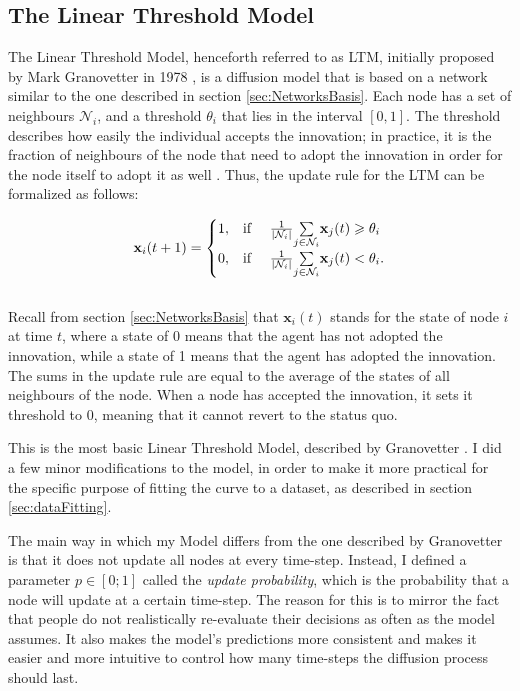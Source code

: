 \documentclass[11pt]{article}
\begin{document}
	\subsection{The Linear Threshold Model} \label{sec:LinearThreshold}
	The Linear Threshold Model, henceforth referred to as LTM, initially proposed by Mark Granovetter in 1978 \autocite{Granovetter78}, is a diffusion model that is based on a network similar to the one described in section \ref{sec:NetworksBasis}. Each node has a set of neighbours $\mathcal{N}_i$, and a threshold $\theta_i$ that lies in the interval $[0,1]$. The threshold describes how easily the individual accepts the innovation; in practice, it is the fraction of neighbours of the node that need to adopt the innovation in order for the node itself to adopt it as well \autocite{Granovetter78}. Thus, the update rule for the LTM can be formalized as follows:
	
	$$\mathbf{x}_i(t+1) = 
	\begin{cases}
		1, & \text{if \quad} \frac{1}{\lvert \mathcal{N}_i \rvert} \underset{j \in \mathcal{N}_i}{\sum} \mathbf{x}_j(t) \geqslant \theta_i\\
		0, & \text{if \quad} \frac{1}{\lvert \mathcal{N}_i \rvert} \underset{j \in \mathcal{N}_i}{\sum} \mathbf{x}_j(t) < \theta_i.\\
	\end{cases}
	$$
	\\
	Recall from section \ref{sec:NetworksBasis} that $\mathbf{x}_i(t)$ stands for the state of node $i$ at time $t$, where a state of 0 means that the agent has not adopted the innovation, while a state of 1 means that the agent has adopted the innovation. The sums in the update rule are equal to the average of the states of all neighbours of the node. When a node has accepted the innovation, it sets it threshold to 0, meaning that it cannot revert to the status quo.
	
	This is the most basic Linear Threshold Model, described by Granovetter \autocite{Granovetter78}. I did a few minor modifications to the model, in order to make it more practical for the specific purpose of fitting the curve to a dataset, as described in section \ref{sec:dataFitting}.
	
	The main way in which my Model differs from the one described by Granovetter \autocite{Granovetter78}is that it does not update all nodes at every time-step. Instead, I defined a parameter $p \in [0; 1]$ called the \textit{update probability}, which is the probability that a node will update at a certain time-step. The reason for this is to mirror the fact that people do not realistically re-evaluate their decisions as often as the model assumes. It also makes the model's predictions more consistent and makes it easier and more intuitive to control how many time-steps the diffusion process should last.
	
\end{document}
